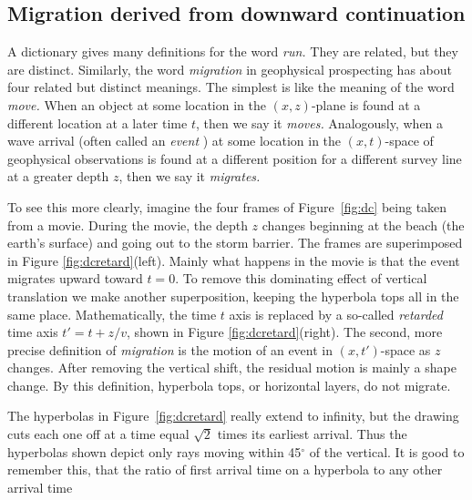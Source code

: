 \subsection{Migration derived from downward continuation}
\par
A dictionary gives many definitions for the word
{\em  run.}
They are related, but they are distinct.
Similarly,
the word
{\em  migration}
in geophysical prospecting has about
four related but distinct meanings.
The simplest is like the meaning of the word
{\em  move.}
When an object at some location in the $(x , z)$-plane
is found at a different location at a later time  $t$,
then we say it 
{\em  moves.}
Analogously, when a wave arrival (often called an %
{\em  event%
} )
at some location in the $(x , t)$-space of geophysical observations
is found at a different position for a different survey line
at a greater depth  $z$, then we say it 
{\em  migrates.}
\par
To see this more clearly,
imagine the four frames of Figure~\ref{fig:dc}
being taken from a movie.
During the movie, the depth  $z$  changes
beginning at the beach (the earth's surface)
and going out to the storm barrier.
The frames are superimposed in Figure \ref{fig:dcretard}(left).
Mainly what happens in the movie is that
the event migrates upward toward  $t=0$.
To remove this dominating effect of vertical translation
we make another superposition,
keeping the hyperbola tops all in the same place.
Mathematically, the time $t$ axis is replaced by a so-called
{\em  retarded}
time axis  $t  '   = t + z/v$, shown in Figure \ref{fig:dcretard}(right).
The second, more precise definition of
{\em  migration}
is the motion of an event in $ ( x , t  '   )$-space as  $z$  changes.
After removing the vertical shift,
the residual motion is mainly a shape change.
By this definition, hyperbola tops, or horizontal layers, do not migrate.
\par
The hyperbolas in Figure~\ref{fig:dcretard} really extend to infinity,
but the drawing cuts each one off at a time equal  $\sqrt{2}$  times
its earliest arrival.
Thus the hyperbolas shown depict only rays
moving within 45$^\circ$ of the vertical.
It is good to remember this,
that the ratio of first arrival time on a hyperbola
to any other arrival time
